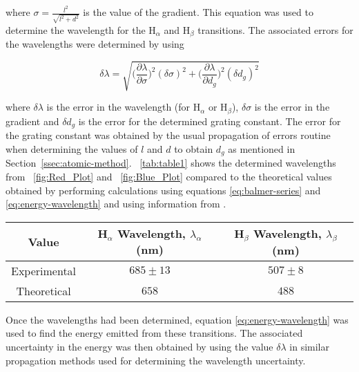 \documentclass{article}
\newcommand{\figref}[2][\figurename~]{#1\ref{#2}}
\newcommand{\tabref}[2][\tablename~]{#1\ref{#2}}
\newcommand{\secref}[2][Section~]{#1\ref{#2}}
\begin{document}
\vspace{2mm}
\noindent
where $\sigma = \frac{l^2}{\sqrt{l^2+d^2}}$ is the value of the gradient. This equation was used to determine the wavelength for the H$_\alpha$ and H$_\beta$ transitions. The associated errors for the wavelengths were determined by using

\begin{equation}
\label{eq:wavelength-error}
\delta\lambda = \sqrt{\bigg(\frac{\partial{\lambda}}{\partial{\sigma}}\bigg)^2(\delta\sigma)^2 + \bigg(\frac{\partial{\lambda}}{\partial{d_g}}\bigg)^2(\delta d_g)^2}
\end{equation}

\vspace{2mm}
\noindent
where $\delta\lambda$ is the error in the wavelength (for H$_\alpha$ or H$_\beta$), $\delta\sigma$ is the error in the gradient and $\delta d_g$ is the error for the determined grating constant. The error for the grating constant was obtained by the usual propagation of errors routine  when determining the values of $l$ and $d$ to obtain $d_g$ as mentioned in \secref{ssec:atomic-method}. \tabref{tab:table1} shows the determined wavelengths from \figref{fig:Red_Plot} and \figref{fig:Blue_Plot} compared to the theoretical values obtained by performing calculations using equations \eqref{eq:balmer-series} and \eqref{eq:energy-wavelength} and using information from \cite{Paper01}.


\vspace{5mm}
\begin{table*}[h]
\centering %
\caption{Table of Experimental Values and Theoretical Values for the Transition Wavelengths.}
\label{tab:table1}
\begin{tabular}{|c|c|c|}
\hline
Value & H$_\alpha$ Wavelength, $\lambda_{\alpha}$(nm) & H$_\beta$ Wavelength, $\lambda_{\beta}$(nm) \\
\hline
Experimental & $685 \pm 13$ & $507 \pm 8$ \\
\hline
Theoretical \cite{Paper01} & $658$ & $488$ \\
\hline
\end{tabular}
\end{table*}


\vspace{2mm}
\noindent
Once the wavelengths had been determined, equation \eqref{eq:energy-wavelength} was used to find the energy emitted from these transitions. The associated uncertainty in the energy was then obtained by using the value $\delta\lambda$ in similar propagation methods used for determining the wavelength uncertainty. 
\end{document}
